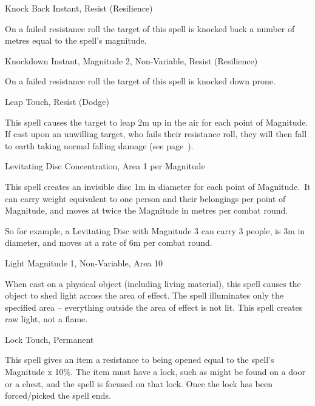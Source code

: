 \begin{rpg-spell}
{Knock Back}
{Instant, Resist (Resilience)}

On a failed resistance roll the target of this spell is knocked back a number of metres equal to the spell’s magnitude.
\end{rpg-spell}


\begin{rpg-spell}
{Knockdown}
{Instant, Magnitude 2, Non-Variable, Resist (Resilience)}

On a failed resistance roll the target of this spell is knocked down prone.
\end{rpg-spell}


\begin{rpg-spell}
{Leap}
{Touch, Resist (Dodge)}

This spell causes the target to leap 2m up in the air for each point of Magnitude. If cast upon an unwilling target, who fails their resistance roll, they will then fall to earth taking normal falling damage (see page~\pageref{ssec:falling}).
\end{rpg-spell}


\begin{rpg-spell}
{Levitating Disc}
{Concentration, Area 1 per Magnitude}

This spell creates an invisible disc 1m in diameter for each point of Magnitude. It can carry weight equivalent to one person and their belongings per point of Magnitude, and moves at twice the Magnitude in metres per combat round.

So for example, a Levitating Disc with Magnitude 3 can carry 3 people, is 3m in diameter, and moves at a rate of 6m per combat round.
\end{rpg-spell}


\begin{rpg-spell}
{Light}
{Magnitude 1, Non-Variable, Area 10}

When cast on a physical object (including living material), this spell causes the object to shed light across the area of effect. The spell illuminates only the specified area – everything outside the area of effect is not lit. This spell creates raw light, not a flame.
\end{rpg-spell}


\begin{rpg-spell}
{Lock}
{Touch, Permanent}

This spell gives an item a resistance to being opened equal to the spell’s Magnitude x 10\%. The item must have a lock, such as might be found on a door or a chest, and the spell is focused on that lock. Once the lock has been forced/picked the spell ends.
\end{rpg-spell}


